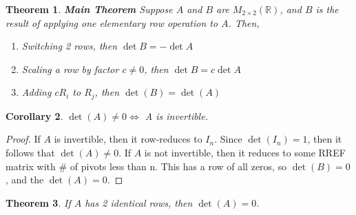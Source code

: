 \documentclass{article}
\newtheorem{theorem}{Theorem}[section]
\newtheorem{corollary}[theorem]{Corollary}
\newtheorem{one minute paper}[theorem]{One Minute Paper}
\begin{document}
\begin{theorem} \textbf{Main Theorem}
    Suppose $A$ and $B$ are $M_{2 \times 2}(\mathbb{R})$, and $B$ is the result of applying one elementary row operation to $A$. Then,
    \begin{enumerate}
        \item Switching 2 rows, then $\det B = -\det A$
        \item Scaling a row by factor $c \neq 0$, then $\det B = c\det A$
        \item Adding $c R_{i}$ to  $R_{j}$, then $\det(B) = \det(A)$ 
    \end{enumerate} 
\end{theorem}

\begin{corollary}
    $\det(A) \neq 0 \iff$ A is invertible. 
\end{corollary}

\begin{proof}
    If $A$ is invertible, then it row-reduces to $I_n$. Since $\det(I_n) = 1$, then it follows that $\det(A) \neq 0$. If $A$ is not invertible, then it reduces to some RREF matrix with \# of pivots less than n.
    This has a row of all zeros, so $\det(B) = 0$, and the $\det(A) = 0$.  
\end{proof}

\begin{theorem}
    If $A$ has 2 identical rows, then $\det(A) = 0$.
\end{theorem}
\end{document}
